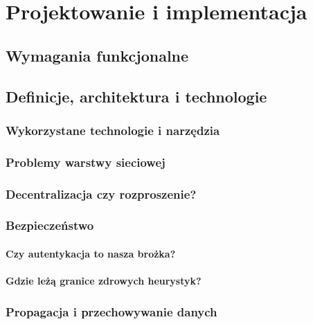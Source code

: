 \chapter{Projektowanie i implementacja}
\label{cha:implementacja}

\section{Wymagania funkcjonalne}
\label{sec:funkcjonalnosc}

\section{Definicje, architektura i technologie}
\label{sec:zalozeniaProjektu}

\subsection{Wykorzystane technologie i narzędzia}
\label{sec:techNTools}

\subsection{Problemy warstwy sieciowej}
\label{sec:networkIssues}

\subsection{Decentralizacja czy rozproszenie?}
\label{sec:decentralizacjaCzyRozproszenie}

\subsection{Bezpieczeństwo}
\label{sec:security}

\subsubsection{Czy autentykacja to nasza brożka?}
\subsubsection{Gdzie leżą granice zdrowych heurystyk?}

\subsection{Propagacja i przechowywanie danych}
\label{sec:dataPropagation}

